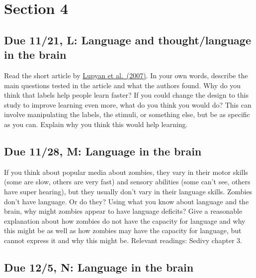 \documentclass[
  letterpaper,
  DIV=11,
  numbers=noendperiod]{scrreprt}
\begin{document}
\hypertarget{section-4}{%
\section*{Section 4}\label{section-4}}


\hypertarget{due-1121-l-language-and-thoughtlanguage-in-the-brain}{%
\subsection*{Due 11/21, L: Language and thought/language in the
brain}\label{due-1121-l-language-and-thoughtlanguage-in-the-brain}}

Read the short article by \href{papers/Lupyanetal2007.pdf}{Lupyan et
al.~(2007)}. In your own words, describe the main questions tested in
the article and what the authors found. Why do you think that labels
help people learn faster? If you could change the design to this study
to improve learning even more, what do you think you would do? This can
involve manipulating the labels, the stimuli, or something else, but be
as specific as you can. Explain why you think this would help learning.

\hypertarget{due-1128-m-language-in-the-brain}{%
\subsection*{Due 11/28, M: Language in the
brain}\label{due-1128-m-language-in-the-brain}}

If you think about popular media about zombies, they vary in their motor
skills (some are slow, others are very fast) and sensory abilities (some
can't see, others have super hearing), but they usually don't vary in
their language skills. Zombies don't have language. Or do they? Using
what you know about language and the brain, why might zombies appear to
have language deficits? Give a reasonable explanation about how zombies
do not have the capacity for language and why this might be as well as
how zombies may have the capacity for language, but cannot express it
and why this might be. Relevant readings: Sedivy chapter 3.

\hypertarget{due-125-n-language-in-the-brain}{%
\subsection*{Due 12/5, N: Language in the
brain}\label{due-125-n-language-in-the-brain}}
\end{document}
